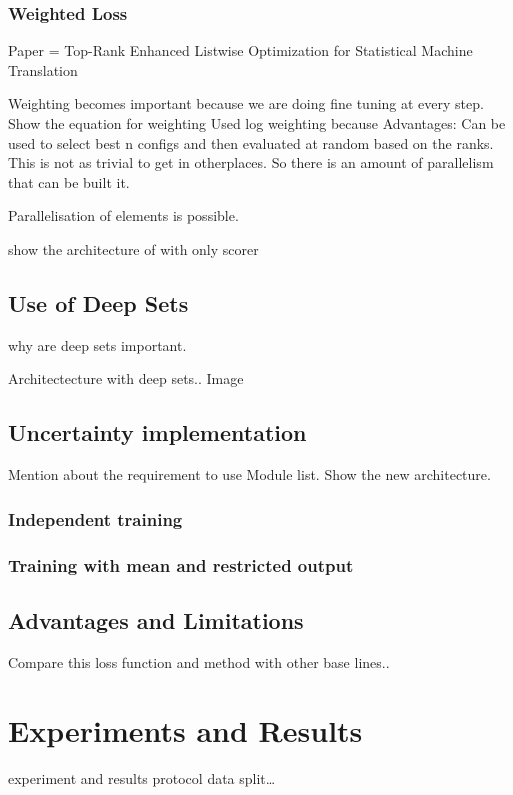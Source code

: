 \documentclass[11pt]{report}
\begin{document}
\subsection{Weighted Loss}
Paper = Top-Rank Enhanced Listwise Optimization for Statistical Machine Translation

Weighting becomes important because we are doing fine tuning at every step.
Show the equation for weighting
Used log weighting because 
Advantages:
Can be used to select best n configs and then evaluated at random based on the ranks. This is not as trivial to get in otherplaces. So there is an amount of parallelism that can be built it.

Parallelisation of elements is possible.

show the architecture of with only scorer
\section{Use of Deep Sets}
why are deep sets important. 

Architectecture with deep sets.. Image

\section{Uncertainty implementation}
Mention about the requirement to use Module list.
Show the new architecture.

\subsection{Independent training}

\subsection{Training with mean and restricted output}



\section{Advantages and Limitations}
Compare this loss function and method with other base lines..


\chapter{Experiments and Results}

experiment and results
protocol
data split…
\end{document}
